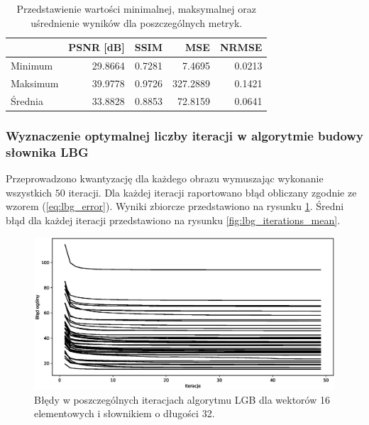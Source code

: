 \documentclass{article}
\begin{document}
\begin{table}[H]
\centering
\begin{tabular}{@{}lrrrr@{}}
\toprule
         & PSNR {[}dB{]} & SSIM  & MSE     & NRMSE \\ \midrule
Minimum  & 29.8664       & 0.7281 & 7.4695   & 0.0213 \\
Maksimum & 39.9778       & 0.9726 & 327.2889 & 0.1421 \\
Średnia  & 33.8828       & 0.8853 & 72.8159  & 0.0641 \\ \bottomrule
\end{tabular}
\caption{Przedstawienie wartości minimalnej, maksymalnej oraz uśrednienie wyników dla poszczególnych metryk.}
\label{tab:lbg_summary}
\end{table}

\subsubsection{Wyznaczenie optymalnej liczby iteracji w algorytmie budowy słownika LBG}

Przeprowadzono kwantyzację dla każdego obrazu wymuszając wykonanie wszystkich $50$ iteracji. Dla każdej iteracji raportowano błąd obliczany zgodnie ze wzorem (\ref{eq:lbg_error}). Wyniki zbiorcze przedstawiono na rysunku \ref{fig:lbg_iterations}. Średni błąd dla każdej iteracji przedstawiono na rysunku \ref{fig:lbg_iterations_mean}. 

\begin{figure}
\centering
  \centering
  \includegraphics[width=.9\linewidth]{images/lbg_4x4_32_50_iterations.eps}  
  \caption{Błędy w poszczególnych iteracjach algorytmu LGB dla wektorów 16 elementowych i słownikiem o długości 32.}
  \label{fig:lbg_iterations}
\end{figure}
\end{document}
